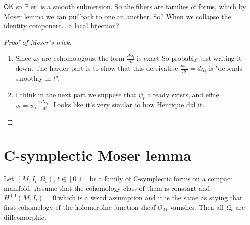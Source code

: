 $\mathsf{OK}$ so $\mathbb{P}\operatorname{er}$ is a smooth submersion. So the fibers are families of forms, which by Moser lemma we can pullback to one an another. {\color{3}So? When we collapse the identity component… a local bijection?}

\begin{proof}[Proof of Moser's trick]\leavevmode
	\begin{enumerate}[label=\textbf{Step \arabic*}]
		\item Since $\omega_t$ are cohomologous, the form $\frac{d\omega_t}{d t}$ is exact {\color{3}So probably just writing it down}. The harder part is to show that this dereivative $\frac{d \omega_t}{dt}=d\eta_t$ is "depends smoothly in $t$".

		\item I think in the next part we suppose that $\psi_t$ already exists, and efine  $v_t=\psi_t^{-1}\frac{d\psi_t}{dt}$. {\color{8}Looks like it's very similar to how Henrique did it…}
	\end{enumerate}
\end{proof}


\section{C-symplectic Moser lemma}

\begin{thm}\leavevmode
	Let  $(M,I_t,\Omega_t)$, $t\in [0,1]$ be a family of C-symplectic forms on a compact manifold. Assume that the cohomology class of them is constant and  $H^{0,1}(M,I_t)=0$ which is a weird assumption and it is the same as  saying that first cohomology of the holomorphic function sheaf $\mathcal{O}_M$ vanishes. Then all $\Omega_t$ are diffeomorphic.
\end{thm}


